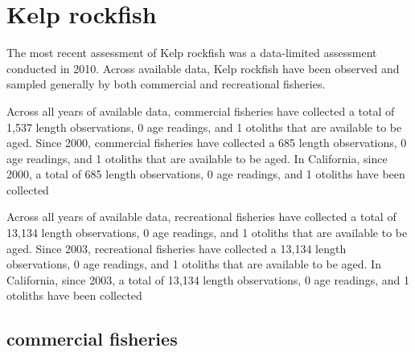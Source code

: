\documentclass[11pt,
  english,
  letterpaper,
]{article}
\begin{document}

\hypertarget{kelp-rockfish}{%
\section{Kelp rockfish}\label{kelp-rockfish}}

\leavevmode\tagmcend\tagstructend


The most recent assessment of Kelp rockfish was a data-limited assessment conducted in 2010. Across available data, Kelp rockfish have been observed and sampled generally by both commercial and recreational fisheries.

\leavevmode\tagmcend\tagstructend\par


Across all years of available data, commercial fisheries have collected a total of 1,537 length observations, 0 age readings, and 1 otoliths that are available to be aged. Since 2000, commercial fisheries have collected a 685 length observations, 0 age readings, and 1 otoliths that are available to be aged. In California, since 2000, a total of 685 length observations, 0 age readings, and 1 otoliths have been collected

\leavevmode\tagmcend\tagstructend\par


Across all years of available data, recreational fisheries have collected a total of 13,134 length observations, 0 age readings, and 1 otoliths that are available to be aged. Since 2003, recreational fisheries have collected a 13,134 length observations, 0 age readings, and 1 otoliths that are available to be aged. In California, since 2003, a total of 13,134 length observations, 0 age readings, and 1 otoliths have been collected

\leavevmode\tagmcend\tagstructend\par


\hypertarget{commercial-fisheries-27}{%
\subsection{commercial fisheries}\label{commercial-fisheries-27}}
\end{document}
